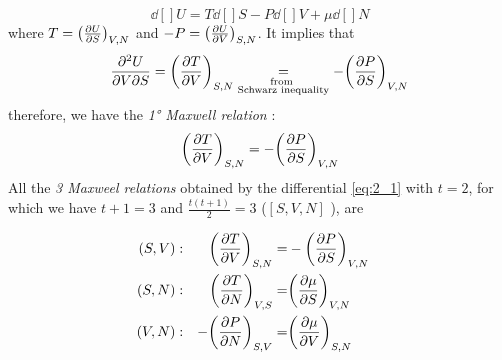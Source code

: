 \documentclass[../main/main.tex]{subfiles}
\begin{document}
\begin{example}
\begin{equation}
  \dd[]{U} = T \dd[]{S} - P \dd[]{V} + \mu \dd[]{N}
  \label{eq:2_1}
\end{equation}
where \( T = \qty(\pdv{U}{S} )_{V,N}  \) and  \( -P = \qty(\pdv{U}{V} )_{S,N}  \). It implies that
\begin{equation*}
        \pdv{U}{V}{S} = \qty(\pdv{T}{V} )_{S,N} \underset{\substack{ \text{from } \\  \text{Schwarz inequality} } }{=} -\qty(\pdv{P}{S} )_{V,N}
\end{equation*}
therefore, we have the \emph{1° Maxwell relation} :
\begin{equation*}
  \qty(\pdv{T}{V} )_{S,N} = -\qty(\pdv{P}{S} )_{V,N}
\end{equation*}
All the \emph{3 Maxweel relations} obtained by the differential \eqref{eq:2_1}
with \( t=2 \), for which we have \( t+1=3 \) and \( \frac{t(t+1)}{2}=3 \) (\( [S,V,N] \) ), are

\begin{subequations}
\begin{align}
  (S,V) &:& \qty(\pdv{T}{V} )_{S,N} =& - \qty(\pdv{P}{S} )_{V,N} & \\
  (S,N) &:& \qty(\pdv{T}{N} )_{V,S} =& \qty(\pdv{\mu }{S} )_{V,N} &\\
  (V,N) &:& -\qty(\pdv{P}{N} )_{S,V} =& \qty(\pdv{\mu }{V} )_{S,N} &
 \end{align}
\label{}
\end{subequations}
\end{example}
\end{document}
